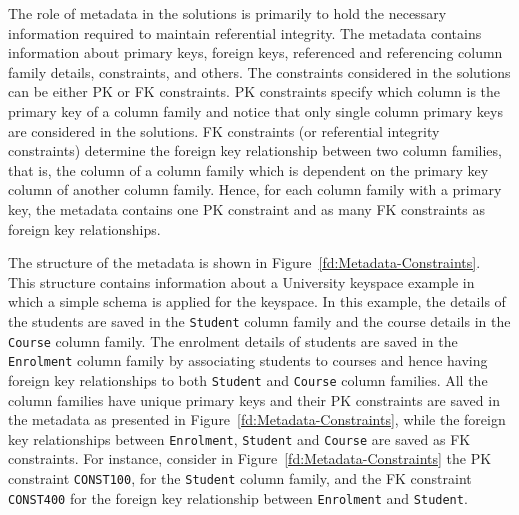 The role of metadata in  the solutions is primarily to hold the necessary
 information required to maintain referential integrity. The metadata contains  
 information about primary keys,   foreign keys,  referenced and referencing
 column family details, constraints, and others.  The constraints considered in
 the solutions can be either \ac{PK} or \ac{FK}
constraints. \ac{PK} constraints specify which column is the primary key of a
column family and notice that only single column primary keys are
considered in the solutions. \ac{FK} constraints (or referential integrity
constraints) determine the foreign key relationship between two column families, that is, the
 column of a column family which  is dependent on the primary key  column of
 another column family.  Hence, for each column family with a primary key,  the
metadata  contains one \ac{PK} constraint  and  as
many \ac{FK} constraints as foreign key relationships. 

The structure of the metadata is shown in
Figure~\ref{fd:Metadata-Constraints}.  This structure contains information about a
University keyspace example in which  a simple schema is applied for the
keyspace. In this example,  the details of the students are saved in  the
\texttt{Student} column family and the course
 details in the \texttt{Course} column family.
 The enrolment details of students are saved in the 
\texttt{Enrolment} column family by associating students to courses and
hence having foreign key relationships to both \texttt{Student} and
\texttt{Course} column families.
All the column families have unique primary keys and their \ac{PK} constraints are saved in
the metadata as presented in Figure~\ref{fd:Metadata-Constraints}, while the
foreign key relationships between \texttt{Enrolment}, \texttt{Student} and
\texttt{Course} are saved as \ac{FK} constraints.  For instance, consider in
 Figure~\ref{fd:Metadata-Constraints} the \ac{PK} constraint \texttt{CONST100},
 for the \texttt{Student} column family, and the \ac{FK} constraint  
 \texttt{CONST400} for the foreign key relationship between
\texttt{Enrolment} and \texttt{Student}.

